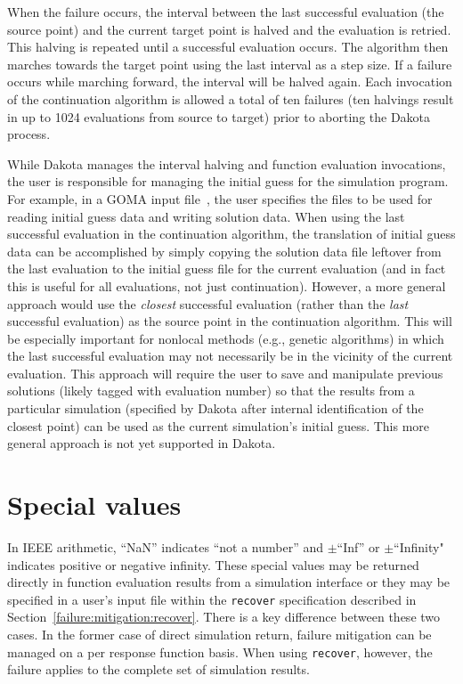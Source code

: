 When the failure occurs, the interval between the last successful
evaluation (the source point) and the current target point is halved
and the evaluation is retried. This halving is repeated until a
successful evaluation occurs. The algorithm then marches towards the
target point using the last interval as a step size. If a failure
occurs while marching forward, the interval will be halved again. Each
invocation of the continuation algorithm is allowed a total of ten
failures (ten halvings result in up to 1024 evaluations from source to
target) prior to aborting the Dakota process.

While Dakota manages the interval halving and function evaluation
invocations, the user is responsible for managing the initial guess
for the simulation program. For example, in a GOMA input
file~\cite{Sch95}, the user specifies the files to be used for reading
initial guess data and writing solution data. When using the last
successful evaluation in the continuation algorithm, the translation
of initial guess data can be accomplished by simply copying the
solution data file leftover from the last evaluation to the initial
guess file for the current evaluation (and in fact this is useful for
all evaluations, not just continuation). However, a more general
approach would use the \emph{closest} successful evaluation (rather
than the \emph{last} successful evaluation) as the source point in the
continuation algorithm. This will be especially important for nonlocal
methods (e.g., genetic algorithms) in which the last successful
evaluation may not necessarily be in the vicinity of the current
evaluation. This approach will require the user to save and manipulate
previous solutions (likely tagged with evaluation number) so that the
results from a particular simulation (specified by Dakota after
internal identification of the closest point) can be used as the
current simulation's initial guess.  This more general approach is not
yet supported in Dakota.

\section{Special values} \label{failure:special}

In IEEE arithmetic, ``NaN'' indicates ``not a number'' and
$\pm$``Inf'' or $\pm$``Infinity" indicates positive or negative
infinity.  These special values may be returned directly in function
evaluation results from a simulation interface or they may be
specified in a user's input file within the \texttt{recover}
specification described in Section~\ref{failure:mitigation:recover}.
There is a key difference between these two cases.  In the former case
of direct simulation return, failure mitigation can be managed on a
per response function basis.  When using \texttt{recover}, however,
the failure applies to the complete set of simulation results.

